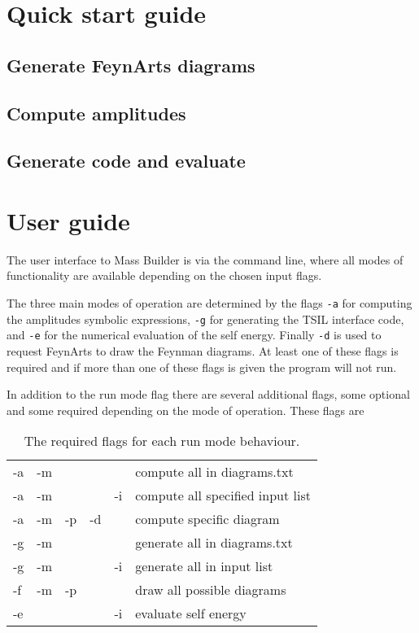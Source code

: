 \section{Quick start guide}

\subsection{Generate FeynArts diagrams}\label{generate_diagrams}

\subsection{Compute amplitudes}

\subsection{Generate code and evaluate}


\section{User guide}

The user interface to Mass Builder is via the command line, where all modes of functionality are available depending on the chosen input flags.

The three main modes of operation are determined by the flags \lstinline{-a} for computing the amplitudes symbolic expressions, \lstinline{-g} for generating the TSIL interface code, and \lstinline{-e} for the numerical evaluation of the self energy.  Finally \lstinline{-d} is used to request FeynArts to draw the Feynman diagrams.  At least one of these flags is required and if more than one of these flags is given the program will not run.

In addition to the run mode flag there are several additional flags, some optional and some required depending on the mode of operation.  These flags are
\begin{table}
\caption{The required flags for each run mode behaviour.}
\begin{tabular}{l c c c c l} 
\hline
-a & -m & & & &compute all in diagrams.txt \\
-a & -m &  && -i&compute  all specified input list\\
-a & -m & -p & -d && compute specific diagram\\
-g & -m & & &  &generate all in diagrams.txt \\
-g & -m &  & & -i &generate all in input list\\
-f & -m & -p & & &draw all possible diagrams\\
-e &  & & & -i&evaluate self energy\\
\hline\end{tabular}
\end{table}


